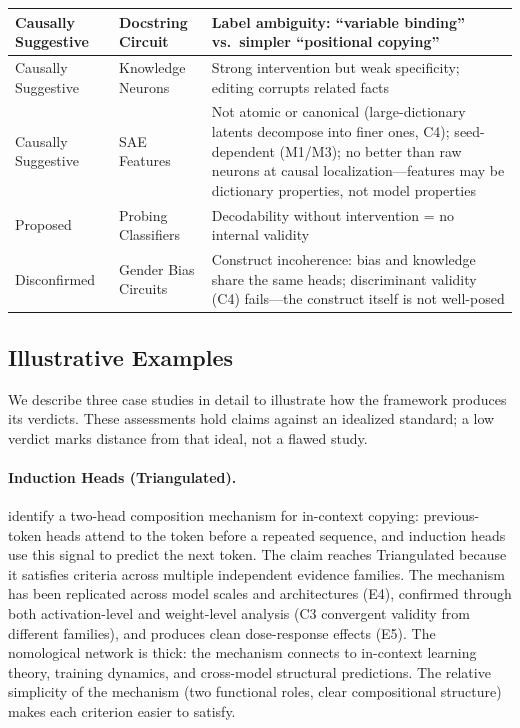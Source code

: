 \documentclass{article}
\begin{document}
\begin{table}[H]
\begin{tabular}{@{}l>{\raggedright\arraybackslash}p{3cm}>{\raggedright\arraybackslash}p{7cm}@{}}
\midrule
Causally Suggestive & Docstring Circuit \citep{heimersheim2023docstring} & Label ambiguity: ``variable binding'' vs.\ simpler ``positional copying'' \\
\midrule
Causally Suggestive & Knowledge Neurons \citep{dai2022knowledge} & Strong intervention but weak specificity; editing corrupts related facts \\
\midrule
Causally Suggestive & SAE Features \citep{cunningham2023sparse, leask2025canonical} & Not atomic or canonical (large-dictionary latents decompose into finer ones, C4); seed-dependent (M1/M3); no better than raw neurons at causal localization---features may be dictionary properties, not model properties \\
\midrule
Proposed & Probing Classifiers \citep{belinkov2022probing} & Decodability without intervention = no internal validity \\
\midrule
Disconfirmed & Gender Bias Circuits \citep{vig2020gender} & Construct incoherence: bias and knowledge share the same heads; discriminant validity (C4) fails---the construct itself is not well-posed \\
\bottomrule
\end{tabular}
\end{table}


\subsection{Illustrative Examples}

We describe three case studies in detail to illustrate how the framework produces its verdicts. These assessments hold claims against an idealized standard; a low verdict marks distance from that ideal, not a flawed study.

\paragraph{Induction Heads (Triangulated).} \citet{olsson2022context} identify a two-head composition mechanism for in-context copying: previous-token heads attend to the token before a repeated sequence, and induction heads use this signal to predict the next token. The claim reaches Triangulated because it satisfies criteria across multiple independent evidence families. The mechanism has been replicated across model scales and architectures (E4), confirmed through both activation-level and weight-level analysis (C3 convergent validity from different families), and produces clean dose-response effects (E5). The nomological network is thick: the mechanism connects to in-context learning theory, training dynamics, and cross-model structural predictions. The relative simplicity of the mechanism (two functional roles, clear compositional structure) makes each criterion easier to satisfy.
\end{document}
